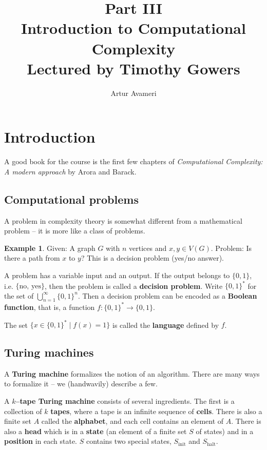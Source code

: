 \documentclass{article}
\title{Part III \\ Introduction to Computational Complexity
    \\ \large
    Lectured by Timothy Gowers 
}
\author{Artur Avameri}
\date{}
\theoremstyle{definition}
\newtheorem{example}{Example}[section]
\begin{document}
\maketitle
\tableofcontents
\newpage
 
\section{Introduction}
 
A good book for the course is the first few chapters of \textit{Computational Complexity: A modern approach} by Arora and Barack.

\subsection{Computational problems}

A problem in complexity theory is somewhat different from a mathematical problem -- it is more like a class of problems.
\begin{example}
    Given: A graph $G$ with $n$ vertices and $x,y \in V(G)$. Problem: Is there a path from $x$ to $y$? This is a decision problem (yes/no answer).
\end{example}
A problem has a variable input and an output. If the output belongs to $\{0,1\}$, i.e. $\{\text{no, yes}\}$, then the problem is called a \textbf{decision problem}. Write $\{0,1\}^*$ for the set of $\bigcup_{n=1}^\infty \{0,1\}^n$. Then a decision problem can be encoded as a \textbf{Boolean function}, that is, a function $f : \{0,1\}^* \to \{0,1\}$.
\vspace{1mm}
 
The set $\{x \in \{0,1\}^* \mid f(x) = 1\}$ is called the \textbf{language} defined by $f$.

\subsection{Turing machines}

A \textbf{Turing machine} formalizes the notion of an algorithm. There are many ways to formalize it -- we (handwavily) describe a few.
\vspace{1mm}
 
A \textbf{$k$--tape Turing machine} consists of several ingredients. The first is a collection of $k$ \textbf{tapes}, where a tape is an infinite sequence of \textbf{cells}. There is also a finite set $A$ called the \textbf{alphabet}, and each cell contains an element of $A$. There is also a \textbf{head} which is in a \textbf{state} (an element of a finite set $S$ of states) and in a \textbf{position} in each state. $S$ contains two special states, $S_{\text{init}}$ and $S_{\text{halt}}$. 
\vspace{1mm}
 
\end{document}
